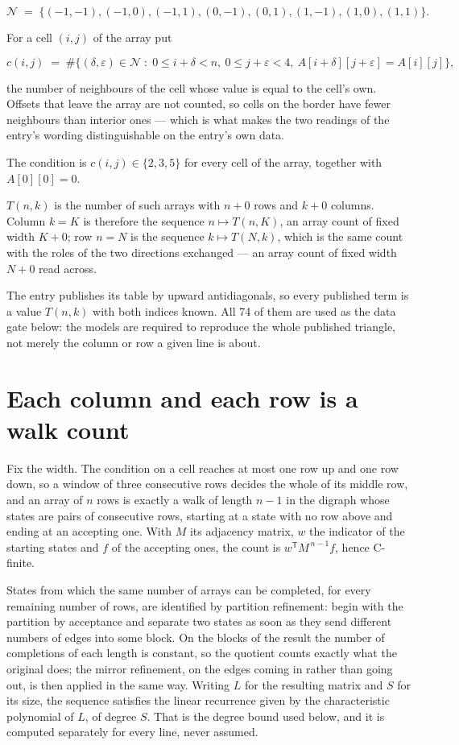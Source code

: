 \documentclass[11pt]{article}
\theoremstyle{definition}
\begin{document}
\[\mathcal{N} \;=\; \{(-1,-1), (-1,0), (-1,1), (0,-1), (0,1), (1,-1), (1,0), (1,1)\}.\]

For a cell $(i,j)$ of the array put

\[c(i,j) \;=\; \#\bigl\{(\delta,\varepsilon)\in\mathcal{N} \;:\; 0\le i+\delta<n,\ 0\le j+\varepsilon<4,\ A[i+\delta][j+\varepsilon] = A[i][j]\bigr\},\]

the number of neighbours of the cell whose value is equal to the cell's own. Offsets that leave the array are not counted, so cells on the border have fewer neighbours than interior ones --- which is what makes the two readings of the entry's wording distinguishable on the entry's own data.

The condition is $c(i,j) \in \{2, 3, 5\}$ for every cell of the array, together with $A[0][0]=0$.

$T(n,k)$ is the number of such arrays with $n + 0$ rows and $k + 0$ columns. Column $k = K$ is therefore the sequence $n \mapsto T(n,K)$, an array count of fixed width $K + 0$; row $n = N$ is the sequence $k \mapsto T(N,k)$, which is the same count with the roles of the two directions exchanged --- an array count of fixed width $N + 0$ read across.

The entry publishes its table by upward antidiagonals, so every published term is a value $T(n,k)$ with both indices known. All 74 of them are used as the data gate below: the models are required to reproduce the whole published triangle, not merely the column or row a given line is about.

\section{Each column and each row is a walk count}

Fix the width. The condition on a cell reaches at most one row up and one row down, so a window of three consecutive rows decides the whole of its middle row, and an array of $n$ rows is exactly a walk of length $n-1$ in the digraph whose states are pairs of consecutive rows, starting at a state with no row above and ending at an accepting one. With $M$ its adjacency matrix, $w$ the indicator of the starting states and $f$ of the accepting ones, the count is $w^{\mathsf T}M^{\,n-1}f$, hence C-finite.

States from which the same number of arrays can be completed, for every remaining number of rows, are identified by partition refinement: begin with the partition by acceptance and separate two states as soon as they send different numbers of edges into some block. On the blocks of the result the number of completions of each length is constant, so the quotient counts exactly what the original does; the mirror refinement, on the edges coming in rather than going out, is then applied in the same way. Writing $L$ for the resulting matrix and $S$ for its size, the sequence satisfies the linear recurrence given by the characteristic polynomial of $L$, of degree $S$. That is the degree bound used below, and it is computed separately for every line, never assumed.
\end{document}
